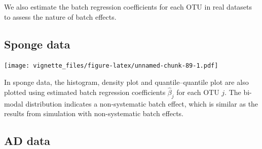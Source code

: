\documentclass[]{book}
\newenvironment{Shaded}{\begin{snugshade}}{\end{snugshade}}
\newcommand{\KeywordTok}[1]{\textcolor[rgb]{0.13,0.29,0.53}{\textbf{#1}}}
\newcommand{\DataTypeTok}[1]{\textcolor[rgb]{0.13,0.29,0.53}{#1}}
\newcommand{\DecValTok}[1]{\textcolor[rgb]{0.00,0.00,0.81}{#1}}
\newcommand{\StringTok}[1]{\textcolor[rgb]{0.31,0.60,0.02}{#1}}
\newcommand{\ControlFlowTok}[1]{\textcolor[rgb]{0.13,0.29,0.53}{\textbf{#1}}}
\newcommand{\OperatorTok}[1]{\textcolor[rgb]{0.81,0.36,0.00}{\textbf{#1}}}
\newcommand{\NormalTok}[1]{#1}
\begin{document}
We also estimate the batch regression coefficients for each OTU in real
datasets to assess the nature of batch effects.

\subsection{Sponge data}\label{sponge-data}

\begin{Shaded}
\end{Shaded}

\texttt{[image: vignette\_files/figure-latex/unnamed-chunk-89-1.pdf]}

In sponge data, the histogram, density plot and quantile--quantile plot
are also plotted using estimated batch regression coefficients
\(\hat{\beta}_{j}\) for each OTU \(j\). The bi-modal distribution
indicates a non-systematic batch effect, which is similar as the results
from simulation with non-systematic batch effects.

\subsection{AD data}\label{ad-data}
\end{document}
